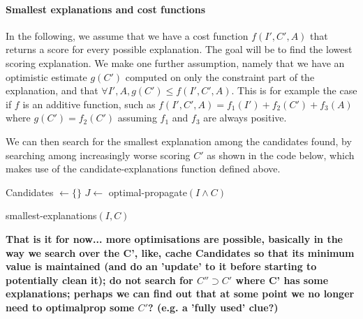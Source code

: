 \paragraph{Smallest explanations and cost functions}
In the following, we assume that we have a cost function $f(I', C', A)$ that returns a score for every possible explanation. The goal will be to find the lowest scoring explanation. We make one further assumption, namely that we have an optimistic estimate $g(C')$ computed on only the constraint part of the explanation, and that $\forall I', A, g(C') \leq f(I', C', A)$. This is for example the case if $f$ is an additive function, such as $f(I', C', A) = f_1(I') + f_2(C') + f_3(A)$ where $g(C') = f_2(C')$ assuming $f_1$ and $f_3$ are always positive.

We can then search for the smallest explanation among the candidates found, by searching among increasingly worse scoring $C'$ as shown in the code below, which makes use of the candidate-explanations function defined above.

\begin{algorithm}


  Candidates $\gets \{\}$\;
  $J \gets$ optimal-propagate$(I \wedge C)$\;
\caption{smallest-explanations$(I,C)$}
\label{alg:cand}
\end{algorithm}


\textbf{That is it for now... more optimisations are possible, basically in the way we search over the C', like, cache Candidates so that its minimum value is maintained (and do an 'update' to it before starting to potentially clean it); do not search for $C'' \supset C'$ where C' has some explanations; perhaps we can find out that at some point we no longer need to optimalprop some $C'$? (e.g. a 'fully used' clue?)}

